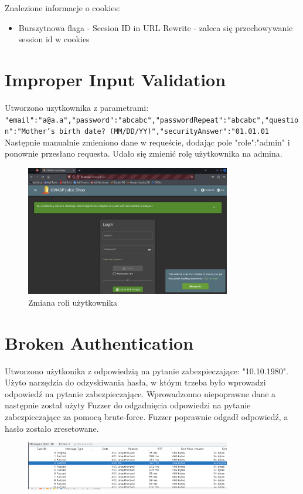 \documentclass{article}
\begin{document}
Znalezione informacje o cookies:
\begin{itemize}
    \item Burszytnowa flaga - Seesion ID in URL Rewrite - zaleca się przechowywanie session id w cookies
\end{itemize}

\section*{Improper Input Validation}
Utworzono uzytkownika z parametrami:
\texttt{"email":"a@a.a","password":"abcabc","passwordRepeat":"abcabc","question":"Mother's birth date? (MM/DD/YY)","securityAnswer":"01.01.01}
Następnie manualnie zmieniono dane w requeście, dodając pole "role":"admin" i ponownie przesłano requesta. Udało się zmienić rolę użytkownika na admina.
\begin{figure}[H]
    \centering
    \includegraphics[width=0.8\textwidth]{admin_success.png}
    \caption{Zmiana roli użytkownika}
\end{figure}

\section*{Broken Authentication}
Utworzono użytkonika z odpowiedzią na pytanie zabezpieczające: "10.10.1980".
Użyto narzędzia do odzyskiwania hasła, w któym trzeba było wprowadzi  odpowiedź na pytanie zabezpieczające. Wprowadzonno niepoprawne dane a następnie został użyty Fuzzer do odgadnięcia odpowiedzi na pytanie zabezpieczające za pomocą brute-force.
Fuzzer poprawnie odgadł odpowiedź, a hasło zostało zresetowane.
\begin{figure}[H]
    \centering
    \includegraphics[width=0.8\textwidth]{fuzzer.png}
\end{figure}
\end{document}
